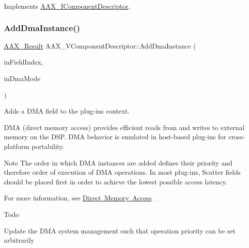 Implements \mbox{\hyperlink{a01781_ad8daad601b60fdbd6134fe0c8faa2fc4}{A\+A\+X\+\_\+\+I\+Component\+Descriptor}}.

\mbox{\label{a01901_ac6663697038ae02344ac541f79d261e0}} 
\subsubsection{\texorpdfstring{AddDmaInstance()}{AddDmaInstance()}}
{\footnotesize\ttfamily \mbox{\hyperlink{a00392_a4d8f69a697df7f70c3a8e9b8ee130d2f}{A\+A\+X\+\_\+\+Result}} A\+A\+X\+\_\+\+V\+Component\+Descriptor\+::\+Add\+Dma\+Instance (\begin{DoxyParamCaption}\item[{\mbox{\hyperlink{a00392_ae807f8986143820cfb5d6da32165c9c7}{A\+A\+X\+\_\+\+C\+Field\+Index}}}]{in\+Field\+Index,  }\item[{\mbox{\hyperlink{a01809_af8d0f19f2896dd6dbd126b919b24e39b}{A\+A\+X\+\_\+\+I\+Dma\+::\+E\+Mode}}}]{in\+Dma\+Mode }\end{DoxyParamCaption})\hspace{0.3cm}{\ttfamily [virtual]}}



Adds a D\+MA field to the plug-\/in\textquotesingle{}s context. 

D\+MA (direct memory access) provides efficient reads from and writes to external memory on the D\+SP. D\+MA behavior is emulated in host-\/based plug-\/ins for cross-\/platform portability.

\begin{DoxyNote}{Note}
The order in which D\+MA instances are added defines their priority and therefore order of execution of D\+MA operations. In most plug-\/ins, Scatter fields should be placed first in order to achieve the lowest possible access latency.
\end{DoxyNote}
For more information, see \mbox{\hyperlink{a00810}{Direct Memory Access}} .

\begin{DoxyRefDesc}{Todo}
\item[\mbox{\hyperlink{a00785__todo000042}{Todo}}]Update the D\+MA system management such that operation priority can be set arbitrarily\end{DoxyRefDesc}



